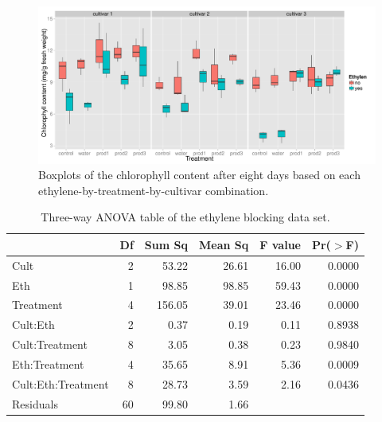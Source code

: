 \documentclass[12pt]{article}\usepackage[]{graphicx}\usepackage[]{color}
\makeatletter
\def\maxwidth{ %
  \ifdim\Gin@nat@width>\linewidth
    \linewidth
  \else
    \Gin@nat@width
  \fi
}
\newenvironment{knitrout}{}{} %
\makeatother
\begin{document}
\begin{knitrout}
\color{fgcolor}\begin{figure}[]

\includegraphics[width=\maxwidth]{figure/chunk62} \caption[Boxplots of the chlorophyll content after eight days based on each ethylene-by-treatment-by-cultivar combination]{Boxplots of the chlorophyll content after eight days based on each ethylene-by-treatment-by-cultivar combination.\label{fig:chunk62}}
\end{figure}


\end{knitrout}


\begin{table}[ht]
\centering
\begin{tabular}{lrrrrr}
  \hline
 & Df & Sum Sq & Mean Sq & F value & Pr($>$F) \\ 
  \hline
Cult & 2 & 53.22 & 26.61 & 16.00 & 0.0000 \\ 
  Eth & 1 & 98.85 & 98.85 & 59.43 & 0.0000 \\ 
  Treatment & 4 & 156.05 & 39.01 & 23.46 & 0.0000 \\ 
  Cult:Eth & 2 & 0.37 & 0.19 & 0.11 & 0.8938 \\ 
  Cult:Treatment & 8 & 3.05 & 0.38 & 0.23 & 0.9840 \\ 
  Eth:Treatment & 4 & 35.65 & 8.91 & 5.36 & 0.0009 \\ 
  Cult:Eth:Treatment & 8 & 28.73 & 3.59 & 2.16 & 0.0436 \\ 
  Residuals & 60 & 99.80 & 1.66 &  &  \\ 
   \hline
\end{tabular}
\caption{Three-way ANOVA table of the ethylene blocking data set.} 
\end{table}
\end{document}
